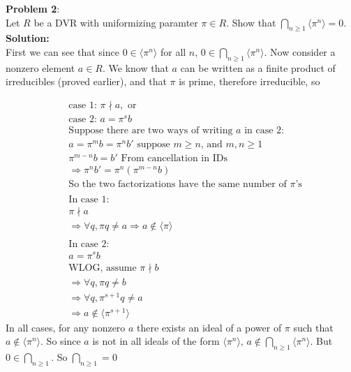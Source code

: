 \documentclass[11pt]{article}
\newcommand{\prob}[3]{\begin{flushleft}
        \textbf{Problem #1}: \\
        #2 
		\textbf{Solution:} 
		#3

\end{flushleft}}
\begin{document}
\prob{2}{
  Let $R$ be a DVR with uniformizing paramter $\pi \in R$. Show that $\bigcap_{n \geq 1} \langle \pi^n \rangle = 0$. \\
}{ \\
  First we can see that since $0 \in \langle \pi ^n \rangle$ for all $n$, $0 \in \bigcap_{n \geq 1} \langle \pi ^ n \rangle$.
  \newline
  Now consider a nonzero element $a \in R$. We know that $a$ can be written as a finite product of irreducibles (proved earlier), and that $\pi$ is prime, therefore irreducible, so

  \begin{align*}
     & \text{case 1: } \pi \nmid a, \text{ or}                                      \\
     & \text{case 2: } a = \pi ^s b                                                 \\
     & \text{Suppose there are two ways of writing $a$ in case 2:}                  \\
     & a = \pi ^ m b = \pi ^ n b' \text{ suppose $m \geq n$, and $m, n \geq 1$}     \\
     & \pi ^ {m-n}b = b' \text{ From cancellation in IDs}                           \\
     & \Rightarrow \pi ^ n b' = \pi^n(\pi ^{m-n} b)                                 \\
     & \text{So the two factorizations have the same number of $\pi$'s}             \\
     &                                                                              \\
     & \text{In case 1:}                                                            \\
     & \pi \nmid a                                                                  \\
     & \Rightarrow \forall q, \pi q \neq a \Rightarrow a \notin \langle \pi \rangle \\
     &                                                                              \\
     & \text{In case 2:}                                                            \\
     & a = \pi ^ s b                                                                \\
     & \text{WLOG, assume $\pi \nmid b$}                                            \\
     & \Rightarrow \forall q, \pi q \neq b                                          \\
     & \Rightarrow \forall q, \pi^{s+1} q \neq a                                    \\
     & \Rightarrow a \notin \langle \pi ^ {s+1} \rangle
  \end{align*}
  In all cases, for any nonzero $a$ there exists an ideal of a power of $\pi$ such that $a \notin \langle \pi ^ n \rangle$. So since $a$ is not in all ideals of the form $\langle \pi ^ n \rangle $, $a \notin \bigcap _{n \geq 1} \langle \pi ^n \rangle$. But $0 \in \bigcap _{n \geq 1}$. So $\bigcap _{n \geq 1} = 0$
}
\end{document}
